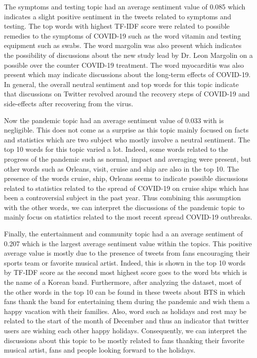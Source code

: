 \documentclass[letterpaper]{article} %
\begin{document}
The symptoms and testing topic had an average sentiment value of 0.085 which indicates a slight positive sentiment in the tweets related to symptoms and testing. The top words with highest TF-IDF score were related to possible remedies to the symptoms of COVID-19 such as the word vitamin and testing equipment such as swabs. The word margolin was also present which indicates the possibility of discussions about the new study lead by Dr. Leon Margolin on a possible over the counter COVID-19 treatment. The word myocarditis was also present which may indicate discussions about the long-term effects of COVID-19. In general, the overall neutral sentiment and top words for this topic indicate that discussions on Twitter revolved around the recovery steps of COVID-19 and side-effects after recovering from the virus.

Now the pandemic topic had an average sentiment value of 0.033 with is negligible. This does not come as a surprise as this topic mainly focused on facts and statistics which are two subject who mostly involve a neutral sentiment. The top 10 words for this topic varied a lot. Indeed, some words related to the progress of the pandemic such as normal, impact and averaging were present, but other words such as Orleans, visit, cruise and ship are also in the top 10. The presence of the words cruise, ship, Orleans seems to indicate possible discussions related to statistics related to the spread of COVID-19 on cruise ships which has been a controversial subject in the past year. Thus combining this assumption with the other words, we can interpret the discussions of the pandemic topic to mainly focus on statistics related to the most recent spread COVID-19 outbreaks.

Finally, the entertainment and community topic had a an average sentiment of 0.207 which is the largest average sentiment value within the topics. This positive average value is mostly due to the presence of tweets from fans encouraging their sports team or favorite musical artist. Indeed, this is shown in the top 10 words by TF-IDF score as the second most highest score goes to the word bts which is the name of a Korean band. Furthermore, after analyzing the dataset, most of the other words in the top 10 can be found in these tweets about BTS in which fans thank the band for entertaining them during the pandemic and wish them a happy vacation with their families. Also, word such as holidays and rest may be related to the start of the month of December and thus an indicator that twitter users are wishing each other happy holidays. Consequently, we can interpret the discussions about this topic to be mostly related to fans thanking their favorite musical artist, fans and people looking forward to the holidays.
\end{document}
